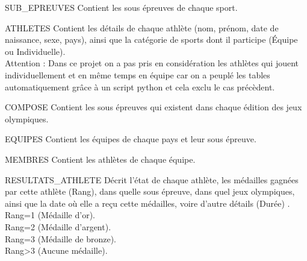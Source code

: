 \documentclass[]{scrreprt}
\begin{document}
			\vspace{0.5cm}
			
			\begin{mytheo}{SUB\_EPREUVES}{}
				Contient les sous épreuves de chaque sport.
			\end{mytheo}
		
			\vspace{0.5cm}
			
			\begin{mytheo}{ATHLETES}{}
				Contient les détails de chaque athlète (nom, prénom, date de naissance, sexe, pays), ainsi que la catégorie de sports dont il participe (Équipe ou Individuelle).\\
				Attention : Dans ce projet on a pas pris en considération les athlètes qui jouent individuellement et en même temps en équipe car on a peuplé les tables automatiquement grâce à un script python et cela exclu le cas précèdent. 
			\end{mytheo}
		
			\vspace{0.5cm}
			
			\begin{mytheo}{COMPOSE}{}
				Contient les sous épreuves qui existent dans chaque édition des jeux olympiques.
			\end{mytheo}
		
			\vspace{0.5cm}
			
			\begin{mytheo}{EQUIPES}{}
				Contient les équipes de chaque pays et leur sous épreuve.
			\end{mytheo}
			
			\vspace{0.5cm}
			
			\begin{mytheo}{MEMBRES}{}
				Contient les athlètes de chaque équipe.
			\end{mytheo}
			
			\vspace{0.5cm}
			
			\begin{mytheo}{RESULTATS\_ATHLETE}{}
				Décrit l'état de chaque athlète, les médailles gagnées par cette athlète (Rang), dans quelle sous épreuve, dans quel jeux olympiques, ainsi que la date où elle a reçu cette médailles, voire d'autre détails (Durée) .\\
				Rang=1 (Médaille d'or).\\
				Rang=2 (Médaille d'argent).\\
				Rang=3 (Médaille de bronze).\\
				Rang>3 (Aucune médaille).
			\end{mytheo}
			
\end{document}
